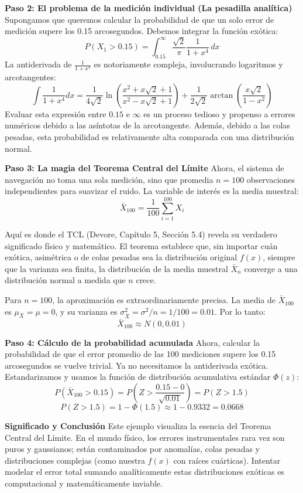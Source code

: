 \textbf{Paso 2: El problema de la medición individual (La pesadilla analítica)}
Supongamos que queremos calcular la probabilidad de que un solo error de medición supere los 0.15 arcosegundos. Debemos integrar la función exótica:
$$ P(X_1 > 0.15) = \int_{0.15}^{\infty} \frac{\sqrt{2}}{\pi} \frac{1}{1 + x^4} \, dx $$
La antiderivada de $\frac{1}{1+x^4}$ es notoriamente compleja, involucrando logaritmos y arcotangentes:
$$ \int \frac{1}{1+x^4} dx = \frac{1}{4\sqrt{2}} \ln\left( \frac{x^2 + x\sqrt{2} + 1}{x^2 - x\sqrt{2} + 1} \right) + \frac{1}{2\sqrt{2}} \arctan\left( \frac{x\sqrt{2}}{1 - x^2} \right) $$
Evaluar esta expresión entre $0.15$ e $\infty$ es un proceso tedioso y propenso a errores numéricos debido a las asíntotas de la arcotangente. Además, debido a las colas pesadas, esta probabilidad es relativamente alta comparada con una distribución normal.

\textbf{Paso 3: La magia del Teorema Central del Límite}
Ahora, el sistema de navegación no toma una sola medición, sino que promedia $n = 100$ observaciones independientes para suavizar el ruido. La variable de interés es la media muestral:
$$ \bar{X}_{100} = \frac{1}{100} \sum_{i=1}^{100} X_i $$

Aquí es donde el TCL (Devore, Capítulo 5, Sección 5.4) revela su verdadero significado físico y matemático. El teorema establece que, sin importar cuán exótica, asimétrica o de colas pesadas sea la distribución original $f(x)$, siempre que la varianza sea finita, la distribución de la media muestral $\bar{X}_n$ converge a una distribución normal a medida que $n$ crece. 

Para $n = 100$, la aproximación es extraordinariamente precisa. La media de $\bar{X}_{100}$ es $\mu_{\bar{X}} = \mu = 0$, y su varianza es $\sigma^2_{\bar{X}} = \sigma^2 / n = 1 / 100 = 0.01$. Por lo tanto:
$$ \bar{X}_{100} \approx N(0, 0.01) $$

\textbf{Paso 4: Cálculo de la probabilidad acumulada}
Ahora, calcular la probabilidad de que el error promedio de las 100 mediciones supere los 0.15 arcosegundos se vuelve trivial. Ya no necesitamos la antiderivada exótica. Estandarizamos y usamos la función de distribución acumulativa estándar $\Phi(z)$:
$$ P(\bar{X}_{100} > 0.15) = P\left( Z > \frac{0.15 - 0}{\sqrt{0.01}} \right) = P(Z > 1.5) $$
$$ P(Z > 1.5) = 1 - \Phi(1.5) \approx 1 - 0.9332 = 0.0668 $$

\textbf{Significado y Conclusión}
Este ejemplo visualiza la esencia del Teorema Central del Límite. En el mundo físico, los errores instrumentales rara vez son puros y gaussianos; están contaminados por anomalías, colas pesadas y distribuciones complejas (como nuestra $f(x)$ con raíces cuárticas). Intentar modelar el error total sumando analíticamente estas distribuciones exóticas es computacional y matemáticamente inviable. 

